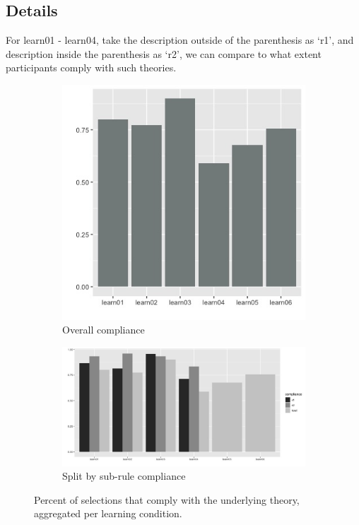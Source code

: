 \documentclass{article}
\begin{document}
\newpage
\subsection{Details}

For learn01 - learn04, take the description outside of the parenthesis as `r1', and description inside the parenthesis as `r2', we can compare to what extent participants comply with such theories.

\begin{figure}[h!]
  \centering
  \begin{subfigure}[t]{0.3\textwidth}
    \centering
    \includegraphics[width=\linewidth]{total_compliance_per_learning_condition} 
    \caption{Overall compliance}
  \end{subfigure}
  \hfill
  \begin{subfigure}[t]{0.6\textwidth}
    \centering
    \includegraphics[width=\linewidth]{compliance_per_learning_condition} 
    \caption{Split by sub-rule compliance}
  \end{subfigure}
  \caption{Percent of selections that comply with the underlying theory, aggregated per learning condition.}
  \label{fig:comp_learn}
\end{figure}
\end{document}
